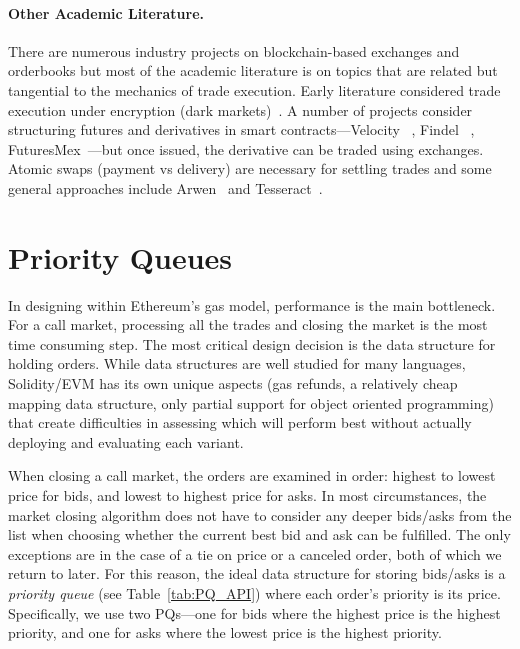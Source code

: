 \paragraph{Other Academic Literature.} There are numerous industry projects on blockchain-based exchanges and orderbooks but most of the academic literature is on topics that are related but tangential to the mechanics of trade execution. Early literature considered trade execution under encryption (\ie dark markets)~\cite{TP07,YSLT10,TW12}. A number of projects consider structuring futures and derivatives in smart contracts---Velocity ~\cite{eskandari2017feasibility}, Findel ~\cite{biryukov2017findel}, FuturesMex~\cite{massacci2018futuresmex}---but once issued, the derivative can be traded using exchanges. Atomic swaps (\ie payment vs delivery) are necessary for settling trades and some general approaches include Arwen~\cite{heilman2020arwen} and Tesseract~\cite{bentov2017tesseract}.


\section{Priority Queues}\label{sec:pq}



In designing \cm within Ethereum's gas model, performance is the main bottleneck. For a call market, processing all the trades and closing the market is the most time consuming step. The most critical design decision is the data structure for holding orders. While data structures are well studied for many languages, Solidity/EVM has its own unique aspects (\eg gas refunds, a relatively cheap mapping data structure, only partial support for object oriented programming) that create difficulties in assessing which will perform best without actually deploying and evaluating each variant. 

When closing a call market, the orders are examined in order: highest to lowest price for bids, and lowest to highest price for asks. In most circumstances, the market closing algorithm does not have to consider any deeper bids/asks from the list when choosing whether the current best bid and ask can be fulfilled. The only exceptions are in the case of a tie on price or a canceled order, both of which we return to later. For this reason, the ideal data structure for storing bids/asks is a \textit{priority queue} (see Table~\ref{tab:PQ_API}) where each order's priority is its price. Specifically, we use two PQs---one for bids where the highest price is the highest priority, and one for asks where the lowest price is the highest priority. 

